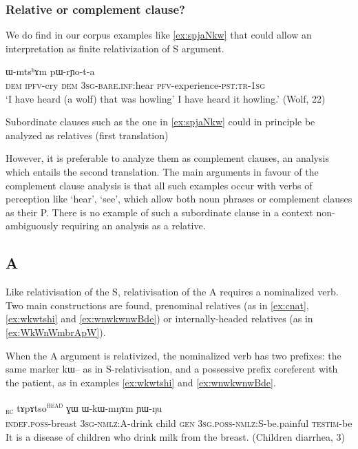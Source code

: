 \documentclass[oldfontcommands,oneside,a4paper,11pt]{article}
\newcommand{\ipa}[1]{{\phon #1}} %
\newcommand{\topic}{\textsc{dem}}
\newcommand{\tete}{\textsuperscript{\textsc{head}}}
\newcommand{\rc}{\textsubscript{\textsc{rc}}}
\begin{document}
\subsubsection{Relative or complement clause?} \label{sec:non.nmlz.s}
We do find in our corpus examples like \ref{ex:spjaNkw}  that could allow an interpretation as  finite relativization of S argument.


\begin{exe}
   \ex  \label{ex:spjaNkw}
\gll [\ipa{nɯ}  	\ipa{tu-ɣɤwu}]  	\ipa{nɯ}  	\ipa{ɯ-mtsʰɤm}  	\ipa{pɯ-rɲo-t-a}\\
\textsc{dem} \textsc{ipfv}-cry \topic{} \textsc{3sg-bare.inf}:hear \textsc{pfv}-experience-\textsc{pst:tr-1sg}\\
\glt `I have heard (a wolf) that was howling'
\glt I have heard it howling.' (Wolf, 22)
\end{exe}

Subordinate clauses such as the one in \ref{ex:spjaNkw} could in principle be analyzed as  relatives (first translation)

However, it is preferable to analyze them as complement clauses, an analysis which entails the second translation. The  main arguments in favour of the complement clause analysis is that all such examples occur with verbs of perception like `hear', `see', which allow both noun phrases or complement clauses as their P. There is no example of such a subordinate clause in a context non-ambiguously requiring an analysis as a relative. 

\subsection{A} \label{sec:a.rel}
Like relativisation of the S, relativisation of the A requires a nominalized verb. Two main constructions are found,  prenominal relatives (as in \ref{ex:cnat}, \ref{ex:wkwtshi}  and \ref{ex:wnwkwnwBde}) or internally-headed relatives (as in \ref{ex:WkWnWmbrApW}).

When the A argument is relativized, the nominalized verb has two prefixes: the same marker \ipa{kɯ}-- as in S-relativisation, and a possessive prefix coreferent with the patient, as in examples \ref{ex:wkwtshi} and \ref{ex:wnwkwnwBde}.


\begin{exe}
   \ex  \label{ex:wkwtshi}
\gll [\ipa{tɯ-nɯ}  	\ipa{ɯ-kɯ-tsʰi}]\rc{}  	\ipa{tɤpɤtso}\tete{}  	\ipa{ɣɯ}  	\ipa{ɯ-kɯ-mŋɤm}  	\ipa{ɲɯ-ŋu}  \\
\textsc{indef.poss}-breast \textsc{3sg-nmlz:A}-drink child \textsc{gen} \textsc{3sg.poss-nmlz:S}-be.painful \textsc{testim}-be \\
\glt It is a disease of children who drink milk from the breast. (Children diarrhea, 3)
\end{exe}
\end{document}
